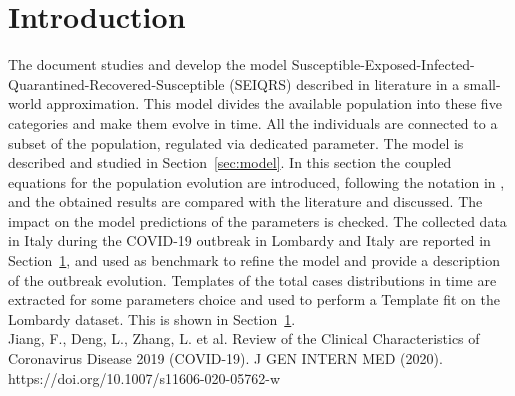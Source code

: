 \section{Introduction}
The document studies and develop the model Susceptible-Exposed-Infected-Quarantined-Recovered-Susceptible (SEIQRS) described in literature \cite{MingLiu} in a small-world approximation. This model divides the available population into these five categories and make them evolve in time. All the individuals are connected to a subset of the population, regulated via dedicated parameter. The model is described and studied in Section~\ref{sec:model}. In this section the coupled equations for the population evolution are introduced, following the notation in \cite{MingLiu}, and the obtained results are compared with the literature and discussed. The impact on the model predictions of the parameters is checked. The collected data in Italy during the COVID-19 outbreak in Lombardy and Italy are reported in Section~\ref{}, and used as benchmark to refine the model and provide a description of the outbreak evolution.
Templates of the total cases distributions in time are extracted for some parameters choice and used to perform a Template fit on the Lombardy dataset. This is shown in Section~\ref{}.\\[2mm]
{\color{red} Jiang, F., Deng, L., Zhang, L. et al. Review of the Clinical Characteristics of Coronavirus Disease 2019 (COVID-19). J GEN INTERN MED (2020). https://doi.org/10.1007/s11606-020-05762-w}